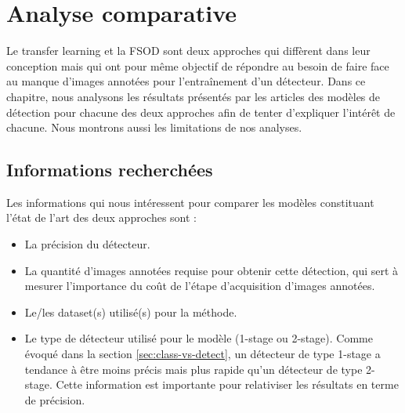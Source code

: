 \chapter{Analyse comparative}
\label{chap:analyse}

Le transfer learning et la FSOD sont deux approches qui diffèrent dans leur conception mais qui ont pour même objectif de répondre au besoin de faire face au manque d'images annotées pour l'entraînement d'un détecteur. Dans ce chapitre, nous analysons les résultats présentés par les articles des modèles de détection pour chacune des deux approches afin de tenter d'expliquer l'intérêt de chacune. Nous montrons aussi les limitations de nos analyses.

\section{Informations recherchées}
\label{sec:analyse-metodologie}


Les informations qui nous intéressent pour comparer les modèles constituant l'état de l'art des deux approches sont : 
\begin{itemize}
    \item La précision du détecteur.
    \item La quantité d'images annotées requise pour obtenir cette détection, qui sert à mesurer l'importance du coût de l'étape d'acquisition d'images annotées.
    \item Le/les dataset(s) utilisé(s) pour la méthode.
    \item Le type de détecteur utilisé pour le modèle (1-stage ou 2-stage). Comme évoqué dans la section \ref{sec:class-vs-detect}, un détecteur de type 1-stage a tendance à être moins précis mais plus rapide qu'un détecteur de type 2-stage. Cette information est importante pour relativiser les résultats en terme de précision.
\end{itemize}


